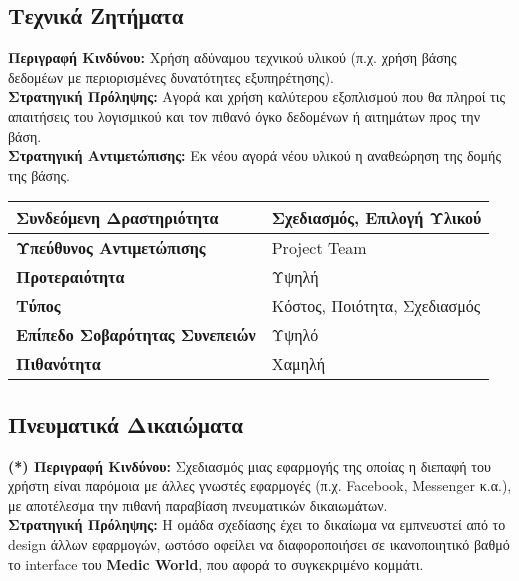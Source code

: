 \documentclass{article}
\newcommand\T{\rule{0pt}{2.6ex}}       %
\newcommand\B{\rule[-1.2ex]{0pt}{0pt}}
\begin{document}
\subsection{Τεχνικά Ζητήματα}

\textbf{Περιγραφή Κινδύνου:} Χρήση αδύναμου τεχνικού υλικού
(π.χ. χρήση βάσης δεδομέων με περιορισμένες δυνατότητες εξυπηρέτησης).\\

\textbf{Στρατηγική Πρόληψης:} Αγορά και χρήση καλύτερου εξοπλισμού που θα πληροί τις
απαιτήσεις του λογισμικού και τον πιθανό όγκο δεδομένων ή αιτημάτων προς την βάση.\\

\textbf{Στρατηγική Αντιμετώπισης:} Εκ νέου αγορά νέου υλικού η αναθεώρηση της δομής της βάσης.\\
 
 \begin{center}
     \begin{tabular}{|l|l|}
     \hline
      \textbf{Συνδεόμενη Δραστηριότητα}   & Σχεδιασμός, Επιλογή Υλικού \T\B \\ 
      \hline
      \textbf{Υπεύθυνος Αντιμετώπισης} & Project Team \T\B \\
      \hline
      \textbf{Προτεραιότητα} & Υψηλή \T\B \\
      \hline
      \textbf{Τύπος} & Κόστος, Ποιότητα, Σχεδιασμός \T\B \\
      \hline
      \textbf{Επίπεδο Σοβαρότητας Συνεπειών} & Υψηλό \T\B \\
      \hline
      \textbf{Πιθανότητα} & Χαμηλή \T\B \\
      \hline
     \end{tabular}
 \end{center}

\newpage
\subsection{Πνευματικά Δικαιώματα}

\textbf{(*) Περιγραφή Κινδύνου:} Σχεδιασμός μιας εφαρμογής της οποίας η διεπαφή του χρήστη είναι παρόμοια με άλλες γνωστές εφαρμογές (π.χ. Facebook, Messenger κ.α.), με αποτέλεσμα την πιθανή παραβίαση πνευματικών δικαιωμάτων. \\

\textbf{Στρατηγική Πρόληψης:} Η ομάδα σχεδίασης έχει το δικαίωμα να εμπνευστεί από το design άλλων εφαρμογών, ωστόσο οφείλει να διαφοροποιήσει σε ικανοποιητικό βαθμό το interface του \textbf{Medic World}, που αφορά το συγκεκριμένο κομμάτι. \\
\end{document}
